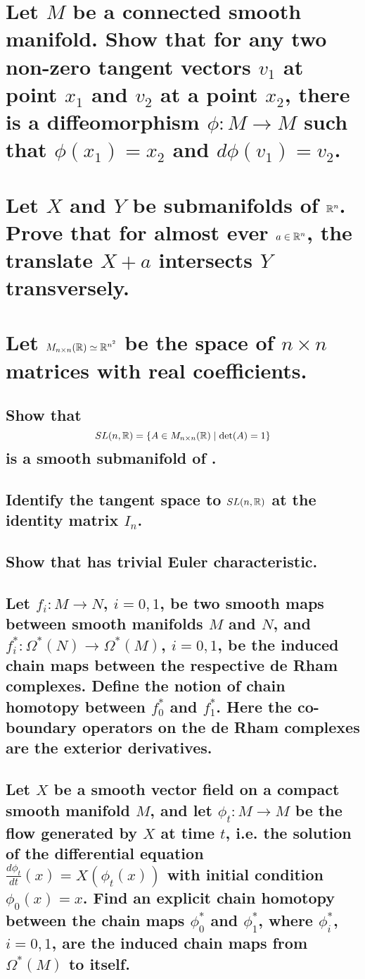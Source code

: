 \documentclass[10pt]{article}
\begin{document}
 

\section{Let $M$ be a connected smooth manifold. Show that for any two non-zero tangent vectors $v_1$ at point $x_1$ and $v_2$ at a point $x_2$, there is a diffeomorphism $\phi : M \to M$ such that $\phi(x_1) = x_2$ and $d\phi(v_1) = v_2$.}

\section{Let $X$ and $Y$ be submanifolds of $\mathbb{R}^n$. Prove that for almost ever $a \in \mathbb{R}^n$, the translate $X + a$ intersects $Y$ transversely.}

\section{Let $M_{n \times n}(\mathbb{R}) \simeq \mathbb{R}^{n^2}$ be the space of $n \times n$ matrices with real coefficients.}
\subsection{Show that $$ SL(n,\mathbb{R}) = \{ A \in M_{n \times n}(\mathbb{R}) \mid \det(A) = 1 \}$$ is a smooth submanifold of .}
\subsection{Identify the tangent space to $SL(n,\mathbb{R})$ at the identity matrix $I_n$.}
\subsection{Show that  has trivial Euler characteristic.}

\advsection
\subsection{Let $f_i : M \to N$, $i = 0,1$, be two smooth maps between smooth manifolds $M$ and $N$, and $f_i^* : \Omega^*(N) \to \Omega^*(M)$, $i = 0,1$, be the induced chain maps between the respective de Rham complexes. Define the notion of chain homotopy between $f_0^*$ and $f_1^*$. Here the co-boundary operators on the de Rham complexes are the exterior derivatives.}
\subsection{Let $X$ be a smooth vector field on a compact smooth manifold $M$, and let $\phi_t: M \to M$ be the flow generated by $X$ at time $t$, i.e. the solution of the differential equation $\frac{d \phi_t}{dt}(x) = X(\phi_t(x))$ with initial condition $\phi_0(x) =x$. Find an explicit chain homotopy between the chain maps $\phi_0^*$ and $\phi_1^*$,  where $\phi_i^*$, $i = 0,1$, are the induced chain maps from $\Omega^*(M)$ to itself. \\  }
\end{document}
